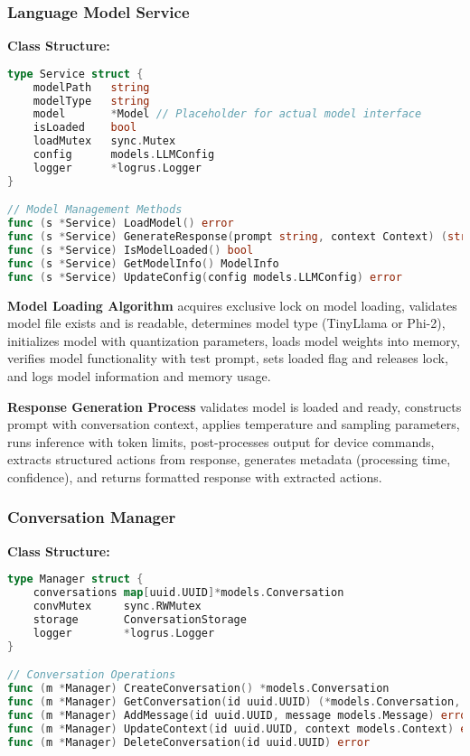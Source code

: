 \documentclass[12pt]{article}
\begin{document}
\subsubsection{Language Model Service}

\textbf{Class Structure:}
\begin{lstlisting}[language=Go, caption=LLM Service Structure]
type Service struct {
    modelPath   string
    modelType   string
    model       *Model // Placeholder for actual model interface
    isLoaded    bool
    loadMutex   sync.Mutex
    config      models.LLMConfig
    logger      *logrus.Logger
}

// Model Management Methods
func (s *Service) LoadModel() error
func (s *Service) GenerateResponse(prompt string, context Context) (string, error)
func (s *Service) IsModelLoaded() bool
func (s *Service) GetModelInfo() ModelInfo
func (s *Service) UpdateConfig(config models.LLMConfig) error
\end{lstlisting}

\textbf{Model Loading Algorithm} acquires exclusive lock on model loading, validates model file exists and is readable, determines model type (TinyLlama or Phi-2), initializes model with quantization parameters, loads model weights into memory, verifies model functionality with test prompt, sets loaded flag and releases lock, and logs model information and memory usage.

\textbf{Response Generation Process} validates model is loaded and ready, constructs prompt with conversation context, applies temperature and sampling parameters, runs inference with token limits, post-processes output for device commands, extracts structured actions from response, generates metadata (processing time, confidence), and returns formatted response with extracted actions.

\subsubsection{Conversation Manager}

\textbf{Class Structure:}
\begin{lstlisting}[language=Go, caption=Conversation Manager Structure]
type Manager struct {
    conversations map[uuid.UUID]*models.Conversation
    convMutex     sync.RWMutex
    storage       ConversationStorage
    logger        *logrus.Logger
}

// Conversation Operations
func (m *Manager) CreateConversation() *models.Conversation
func (m *Manager) GetConversation(id uuid.UUID) (*models.Conversation, error)
func (m *Manager) AddMessage(id uuid.UUID, message models.Message) error
func (m *Manager) UpdateContext(id uuid.UUID, context models.Context) error
func (m *Manager) DeleteConversation(id uuid.UUID) error
\end{lstlisting}
\end{document}
